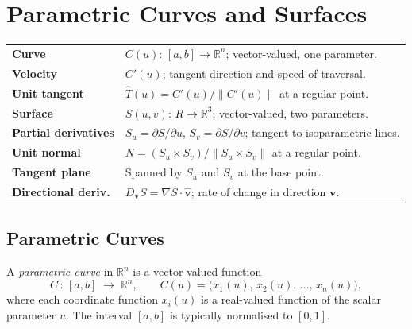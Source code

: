 
\section{Parametric Curves and Surfaces}

\begin{tcolorbox}[colback=gray!6, colframe=gray!40, arc=2pt,
  left=6pt, right=6pt, top=4pt, bottom=4pt,
  title={\small\textbf{Parametric Curves and Surfaces --- Quick Reference}},
  fonttitle=\small\bfseries]
\begin{tabular}{@{}p{}p{}@{}}
\textbf{Curve}               & $C(u):\,[a,b]\to\mathbb{R}^n$; vector-valued, one parameter. \\[4pt]
\textbf{Velocity}            & $C'(u)$; tangent direction and speed of traversal. \\[4pt]
\textbf{Unit tangent}        & $\hat{T}(u) = C'(u)/\|C'(u)\|$ at a regular point. \\[4pt]
\textbf{Surface}             & $S(u,v):\,R\to\mathbb{R}^3$; vector-valued, two parameters. \\[4pt]
\textbf{Partial derivatives} & $S_u = \partial S/\partial u$,\; $S_v = \partial S/\partial v$; tangent to isoparametric lines. \\[4pt]
\textbf{Unit normal}         & $N = (S_u\times S_v)/\|S_u\times S_v\|$ at a regular point. \\[4pt]
\textbf{Tangent plane}       & Spanned by $S_u$ and $S_v$ at the base point. \\[4pt]
\textbf{Directional deriv.}  & $D_{\mathbf{v}}S = \nabla S \cdot \hat{\mathbf{v}}$; rate of change in direction $\mathbf{v}$. \\
\end{tabular}
\end{tcolorbox}

\subsection{Parametric Curves}

\begin{tcolorbox}[colback=propbox, colframe=propborder, arc=2pt,
  left=6pt, right=6pt, top=4pt, bottom=4pt,
  title={\small\textbf{Definition (Parametric Curve)}},
  fonttitle=\small\bfseries]
A \emph{parametric curve} in $\mathbb{R}^n$ is a vector-valued function
\[
  C\,:\,[a,b]\;\to\;\mathbb{R}^n, \qquad
  C(u) = \bigl(x_1(u),\,x_2(u),\,\ldots,\,x_n(u)\bigr),
\]
where each coordinate function $x_i(u)$ is a real-valued function
of the scalar parameter $u$.
The interval $[a,b]$ is typically normalised to $[0,1]$.
\end{tcolorbox}

